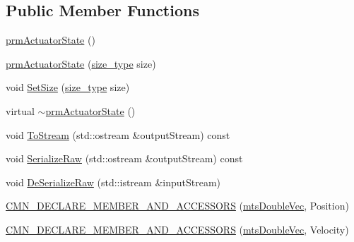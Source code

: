 \subsection*{Public Member Functions}
\begin{DoxyCompactItemize}
\item 
\hyperlink{classprm_actuator_state_a0f0d254bc1c7ab0ea05fee24c919416d}{prm\-Actuator\-State} ()
\item 
\hyperlink{classprm_actuator_state_a02db9c1e2e89740230648e96f43f14e8}{prm\-Actuator\-State} (\hyperlink{classprm_actuator_state_a1ed9ac69482dab8ddf628b1858c42631}{size\-\_\-type} size)
\item 
void \hyperlink{classprm_actuator_state_a73382164db32f41d5c6f5e2e3d0e54e9}{Set\-Size} (\hyperlink{classprm_actuator_state_a1ed9ac69482dab8ddf628b1858c42631}{size\-\_\-type} size)
\item 
virtual \hyperlink{classprm_actuator_state_a4674a03c6ce0ce24384747c3ee4e975b}{$\sim$prm\-Actuator\-State} ()
\item 
void \hyperlink{classprm_actuator_state_a2963fc3909c4bd97fc76ea02a138a0cd}{To\-Stream} (std\-::ostream \&output\-Stream) const 
\item 
void \hyperlink{classprm_actuator_state_a0dd3e2bf894a7db7a059c7488f9b8fcc}{Serialize\-Raw} (std\-::ostream \&output\-Stream) const 
\item 
void \hyperlink{classprm_actuator_state_a1c5271adc0e1ed254796622efe9c2146}{De\-Serialize\-Raw} (std\-::istream \&input\-Stream)
\end{DoxyCompactItemize}
{\bf }\par
\begin{DoxyCompactItemize}
\item 
\hyperlink{classprm_actuator_state_a4bcaf7dfe439525acae3be717330e6c1}{C\-M\-N\-\_\-\-D\-E\-C\-L\-A\-R\-E\-\_\-\-M\-E\-M\-B\-E\-R\-\_\-\-A\-N\-D\-\_\-\-A\-C\-C\-E\-S\-S\-O\-R\-S} (\hyperlink{mts_vector_8h_af69167a5dc2ad33eb93965b9387d8403}{mts\-Double\-Vec}, Position)
\end{DoxyCompactItemize}

{\bf }\par
\begin{DoxyCompactItemize}
\item 
\hyperlink{classprm_actuator_state_a260ecba553569d7e71cbbaf6c9f9194f}{C\-M\-N\-\_\-\-D\-E\-C\-L\-A\-R\-E\-\_\-\-M\-E\-M\-B\-E\-R\-\_\-\-A\-N\-D\-\_\-\-A\-C\-C\-E\-S\-S\-O\-R\-S} (\hyperlink{mts_vector_8h_af69167a5dc2ad33eb93965b9387d8403}{mts\-Double\-Vec}, Velocity)
\end{DoxyCompactItemize}

